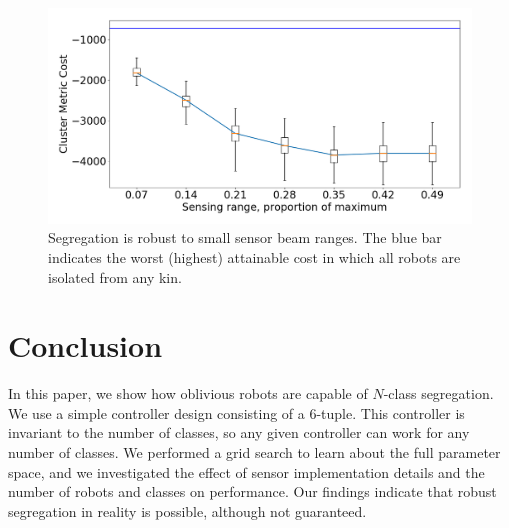\documentclass[conference]{IEEEtran}
\newtheorem{theorem}{Theorem}
\begin{document}
\begin{figure}
  \centering
  \includegraphics[width=1\linewidth]{./images/beam_length.png}
  \caption{Segregation is robust to small sensor beam ranges. The blue bar
    indicates the worst (highest) attainable cost in which all robots are
    isolated from any kin.}
  \label{fig:beam_range}
\end{figure}

\section{Conclusion}

In this paper, we show how oblivious robots are capable of $N$-class
segregation. We use a simple controller design consisting of a 6-tuple. This
controller is invariant to the number of classes, so any given controller can
work for any number of classes. We performed a grid search to learn about the
full parameter space, and we investigated the effect of sensor implementation
details and the number of robots and classes on performance. Our findings
indicate that robust segregation in reality is possible, although not
guaranteed.







\end{document}
